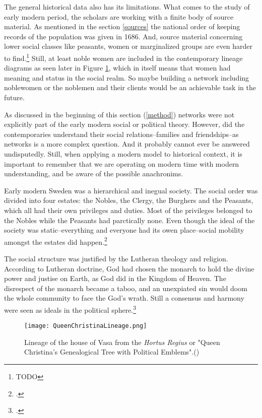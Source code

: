 The general historical data also has its limitations. What comes to the study of early modern period, the scholars are working with a finite body of source material. As mentioned in the section \ref{sources} the national order of keeping records of the population was given in 1686. And, source material concerning lower social classes like peasants, women or marginalized groups are even harder to find.\footnote{TODO} Still, at least noble women are included in the contemporary lineage diagrams as seen later in Figure \ref{queenlineage}, which in itself means that women had meaning and status in the social realm. So maybe building a network including noblewomen or the noblemen and their clients would be an achievable task in the future.

As discussed in the beginning of this section (\ref{method}) networks were not explicitly part of the early modern social or political theory. However, did the contemporaries understand their social relations–families and friendships–as networks is a more complex question. And it probably cannot ever be answered undisputedly. Still, when applying a modern model to historical context, it is important to remember that we are operating on modern time with modern understanding, and be aware of the possible anachronims.

Early modern Sweden was a hierarchical and inegual society. The social order was divided into four estates: the Nobles, the Clergy, the Burghers and the Peasants, which all had their own privileges and duties. Most of the privileges belonged to the Nobles while the Peasants had parctically none. Even though the ideal of the society was static–everything and everyone had its owen place–social mobility amongst the estates did happen.\footcites[p. 21-23,]{hopesAndFearsIntro}[p. 21-22.]{agencyAndStateBuilding} 

The social structure was justified by the Lutheran theology and religion. According to Lutheran doctrine, God had chosen the monarch to hold the divine power and justise on Earth, as God did in the Kingdom of Heaven. The disrespect of the monarch became a taboo, and an unexpiated sin would doom the whole community to face the God's wrath. Still a consensus and harmony were seen as ideals in the political sphere.\footcites[p. 24-28,]{hopesAndFearsIntro}[p. 161-163.]{pSuurvalta}

\begin{figure}
	\texttt{[image: QueenChristinaLineage.png]}
	\caption[Lineage of the house of Vasa from the \textit{Hortus Regius}]{Lineage of the house of Vasa from the \textit{Hortus Regius} or "Queen Christina's Genealogical Tree with Political Emblems".(\cite{hortusregius})} 
	\centering
	\label{queenlineage}
\end{figure}

